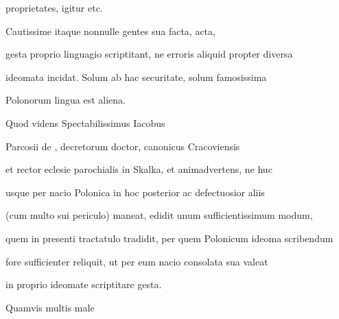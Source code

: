 

\renewcommand{\theFancyVerbLine}{\textcolor{green}{05-17\alph{FancyVerbLine}}}
\begin{VerbatimLatin}[firstnumber=1]
proprietates, igitur etc.

\indentK Cautissime itaque nonnulle gentes sua facta, acta,
\end{VerbatimLatin}
\renewcommand{\theFancyVerbLine}{05-\arabic{FancyVerbLine}\phantom{a}}

\begin{VerbatimLatin}[firstnumber=18]
gesta proprio linguagio scriptitant, ne erroris aliquid propter diversa

ideomata incidat. Solum ab hac securitate, solum famosissima
\end{VerbatimLatin}
\renewcommand{\theFancyVerbLine}{\textcolor{green}{05-20\alph{FancyVerbLine}}}
\begin{VerbatimLatin}[firstnumber=1]
Polonorum lingua est aliena.

\indentK Quod videns Spectabilissimus Iacobus
\end{VerbatimLatin}

\renewcommand{\theFancyVerbLine}{05-\arabic{FancyVerbLine}\phantom{a}}

\begin{VerbatimLatin}[firstnumber=21]
Parcosii de , decretorum doctor, canonicus Cracoviensis

et rector eclesie parochialis in Skalka, et animadvertens, ne huc

usque per  nacio Polonica in hoc posterior ac defectuosior aliis

(cum multo sui periculo) maneat, edidit unum sufficientissimum modum,

quem in presenti tractatulo tradidit, per quem Polonicum ideoma scribendum

fore sufficienter reliquit, ut per eum nacio consolata sua valeat
\end{VerbatimLatin}


\renewcommand{\theFancyVerbLine}{\textcolor{green}{05-27\alph{FancyVerbLine}}}
\begin{VerbatimLatin}[firstnumber=1]
in proprio ideomate scriptitare gesta.

\indentP Quamvis multis male
\end{VerbatimLatin}
\renewcommand{\theFancyVerbLine}{05-\arabic{FancyVerbLine}\phantom{a}}

